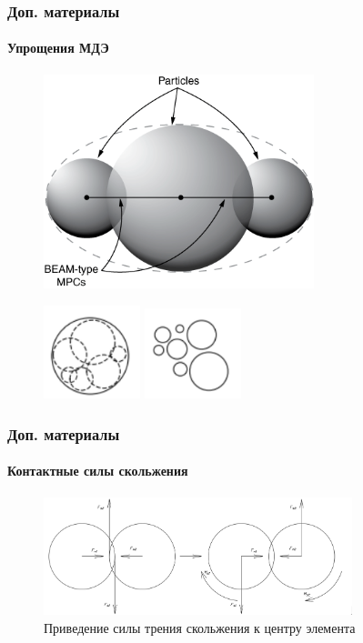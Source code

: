 \documentclass[c]{beamer}  %
\begin{document}
\begin{frame}
\frametitle{Доп. материалы} 
\framesubtitle{Упрощения МДЭ}

\begin{figure}[h!]
	\centering
	\includegraphics[width=0.7\textwidth]{dem-rigid-cluster}
\end{figure} 
\end{frame}

\begin{frame}

\begin{figure}[h!]
	\centering
	\includegraphics[width=0.25\textwidth]{break_before}
	\includegraphics[width=0.25\textwidth]{break_after}
\end{figure} 
\end{frame}


\begin{frame}
\frametitle{Доп. материалы} 
\framesubtitle{Контактные силы скольжения}

\begin{figure}[h!]
	\centering
	\includegraphics[width=0.8\textwidth]{fs_ms}
	\caption{Приведение силы трения скольжения к центру элемента}
	\label{pic:fs_ms}
\end{figure} 
\end{frame}
\end{document}

